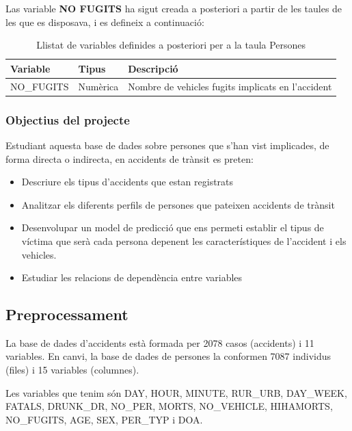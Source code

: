\documentclass[11pt,longbibliography]{article}
\theoremstyle{definition}
\theoremstyle{remark}
\begin{document}
Las variable \textbf{NO FUGITS} ha sigut creada a posteriori a partir de les taules de les que es disposava, i es defineix a continuació:


\begin{table}[H]
\centering
\begin{tabular}{|l|l|l|}
\hline
\textbf{Variable} & \textbf{Tipus} & \textbf{Descripció}                         \\ \hline
NO\_FUGITS     &   Numèrica    &  Nombre de vehicles fugits implicats en l'accident \\ \hline
\end{tabular}
\caption{Llistat de variables definides a posteriori per a la taula Persones}
\end{table}


\subsubsection{Objectius del projecte}

Estudiant aquesta base de dades sobre persones que s'han vist implicades, de forma directa o indirecta, en accidents de trànsit es preten:

\begin{itemize}

\item Descriure els tipus d'accidents que estan registrats

\item Analitzar els diferents perfils de persones que pateixen accidents de trànsit

\item Desenvolupar un model de predicció que ens permeti establir el tipus de víctima que serà cada persona depenent les característiques de l'accident i els vehicles. 

\item Estudiar les relacions de dependència entre variables

\end{itemize}


\subsection{Preprocessament}

La base de dades d'accidents està formada per 2078 casos (accidents) i 11 variables. En canvi, la base de dades de persones la conformen 7087 individus (files) i 15 variables (columnes).


Les variables que tenim són DAY, HOUR, MINUTE, RUR\_URB, DAY\_WEEK, FATALS, DRUNK\_DR, NO\_PER, MORTS, NO\_VEHICLE, HIHAMORTS, NO\_FUGITS, AGE, SEX, PER\_TYP i DOA.
\end{document}
